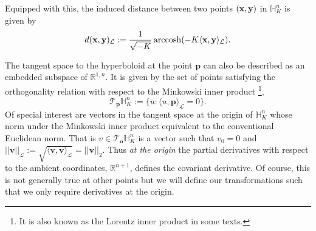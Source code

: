 
Equipped with this, the induced distance between two points $(\mathbf{x},\mathbf{y})$ in $\mathbb{H}^{n}_K$ is given by
\begin{equation}
    d(\textbf{x},\textbf{y})_{\mathcal{L}} := \frac{1}{\sqrt{-K}}\operatorname{arccosh}(-K \langle \textbf{x}, \textbf{y} \rangle_{\mathcal{L}}).
\end{equation}

The tangent space to the hyperboloid at the point $\textbf{p}$ can also be described as an embedded subspace of $\mathbb{R}^{1,n}$.  
It is given by the set of points satisfying the orthogonality relation with respect to the Minkowski inner product \footnote{It is also known as the Lorentz inner product in some texts.},
\begin{equation}
    \mathcal{T}_{\textbf{p}}\mathbb{H}^n_K := \{u: \langle u, \textbf{p} \rangle_{\mathcal{L}} = 0 \}.
\end{equation}
Of special interest are vectors in the tangent space at the origin of $\mathbb{H}^{n}_K$ whose norm under the Minkowski inner product equivalent to the conventional Euclidean norm. That is $v \in \mathcal{T}_{\textbf{o}}\mathbb{H}^{n}_K$ is a vector such that $v_0 = 0$ and $||\textbf{v}||_{\mathcal{L}} := \sqrt{\langle \textbf{v}, \textbf{v}
\rangle_{\mathcal{L}}} = ||\textbf{v}||_2$.  Thus \emph{at the origin} the
partial derivatives with respect to the ambient coordinates, $\mathbb{R}^{n+1}$, defines the
covariant derivative.  
Of course, this is not generally true at other points but we will define our transformations such that we only require derivatives at the origin.

